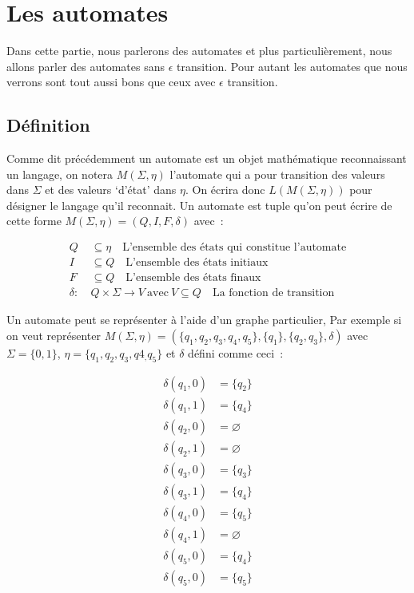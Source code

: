 \documentclass[12pt]{article}
\begin{document}
\section{Les automates}

Dans cette partie, nous parlerons des automates et plus particulièrement, nous
allons parler des automates sans \(\epsilon\) transition. Pour autant les
automates que nous verrons sont tout aussi bons que ceux avec \(\epsilon\)
transition.

\subsection{Définition}

Comme dit précédemment un automate est un objet mathématique reconnaissant un
langage, on notera \(M(\Sigma, \eta)\) l'automate qui a pour transition des
valeurs dans \(\Sigma\) et des valeurs `d'état' dans \(\eta\). On écrira donc
\(L(M(\Sigma, \eta))\) pour désigner le langage qu'il reconnait. Un automate
est tuple qu'on peut écrire de cette forme \(M(\Sigma, \eta) = (Q, I, F,
\delta)\) avec~:

\begin{align}
    Q        & \subseteq \eta \quad \text{L'ensemble des états qui constitue l'automate}                \\
    I        & \subseteq Q \quad \text{L'ensemble des états initiaux}                                   \\
    F        & \subseteq Q \quad \text{L'ensemble des états finaux}                                     \\
    \delta:~ & Q \times \Sigma \to V ~\text{avec}~ V \subseteq Q \quad \text{La fonction de transition}
\end{align}

Un automate peut se représenter à l'aide d'un graphe particulier, Par exemple
si on veut représenter \(M(\Sigma, \eta) = (\{q_1, q_2, q_3, q_4, q_5\},
\{q_1\},\{q_2, q_3\}, \delta)\) avec \(\Sigma = \{0, 1\}\), \(\eta = \{q_1,
q_2, q_3, q4_, q_5\}\) et \(\delta\) défini comme ceci~:

\begin{align*}
    \delta(q_1, 0) & = \{q_2\}     \\
    \delta(q_1, 1) & = \{q_4\}     \\
    \delta(q_2, 0) & = \varnothing \\
    \delta(q_2, 1) & = \varnothing \\
    \delta(q_3, 0) & = \{q_3\}     \\
    \delta(q_3, 1) & = \{q_4\}     \\
    \delta(q_4, 0) & = \{q_5\}     \\
    \delta(q_4, 1) & = \varnothing \\
    \delta(q_5, 0) & = \{q_4\}     \\
    \delta(q_5, 0) & = \{q_5\}     \\
\end{align*}
\end{document}

